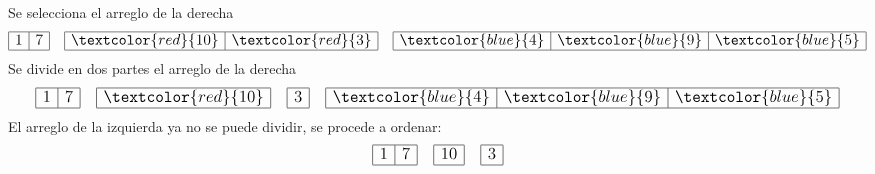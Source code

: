 \documentclass{article}
\begin{document}
\begin{minipage}{0.5\textwidth}
  Se selecciona el arreglo de la derecha
  \begin{equation*}
    \large
    \begin{array}{|r|r|}
      \hline 1 & 7\\ \hline
    \end{array} \quad
    \begin{array}{|r|r|}
      \hline \textcolor{red}{10} & \textcolor{red}{3} \\ \hline
    \end{array}\quad 
    \begin{array}{|r|r|r|}
      \hline \textcolor{blue}{4} & \textcolor{blue}{9} & \textcolor{blue}{5} \\ \hline
    \end{array}
  \end{equation*}
  Se divide en dos partes el arreglo de la derecha
  \begin{equation*}
    \large
    \begin{array}{|r|r|}
      \hline 1 & 7\\ \hline
    \end{array} \quad
    \begin{array}{|r|}
      \hline \textcolor{red}{10} \\ \hline
    \end{array} \quad
    \begin{array}{|r|}
      \hline 3 \\ \hline
    \end{array} \quad 
    \begin{array}{|r|r|r|}
      \hline \textcolor{blue}{4} & \textcolor{blue}{9} & \textcolor{blue}{5} \\ \hline
    \end{array}
  \end{equation*}
  El arreglo de la izquierda ya no se puede dividir, se procede a ordenar:
  \begin{equation*}
    \large
    \begin{array}{|r|r|}
      \hline 1 & 7\\ \hline
    \end{array} \quad
    \begin{array}{|r|}
      \hline 10 \\ \hline
    \end{array} \quad
    \begin{array}{|r|}
      \hline 3 \\ \hline

\end{array}
\end{equation*}
\end{minipage}
\end{document}
